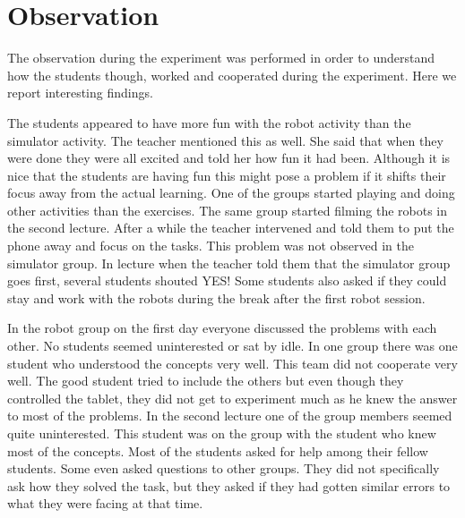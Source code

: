 \section{Observation}
The observation during the experiment was performed in order to understand how the students though, worked and cooperated during the experiment. Here we report interesting findings.

\bigskip\noindent
The students appeared to have more fun with the robot activity than the simulator activity. The teacher mentioned this as well. She said that when they were done they were all excited and told her how fun it had been. Although it is nice that the students are having fun this might pose a problem if it shifts their focus away from the actual learning. One of the groups started playing and doing other activities than the exercises. The same group started filming the robots in the second lecture. After a while the teacher intervened and told them to put the phone away and focus on the tasks. This problem was not observed in the simulator group. In lecture when the teacher told them that the simulator group goes first, several students shouted YES! Some students also asked if they could stay and work with the robots during the break after the first robot session. 

\bigskip\noindent
In the robot group on the first day everyone discussed the problems with each other. No students seemed uninterested or sat by idle. In one group there was one student who understood the concepts very well. This team did not cooperate very well. The good student tried to include the others but even though they controlled the tablet, they did not get to experiment much as he knew the answer to most of the problems. In the second lecture one of the group members seemed quite uninterested. This student was on the group with the student who knew most of the concepts. Most of the students asked for help among their fellow students. Some even asked questions to other groups. They did not specifically ask how they solved the task, but they asked if they had gotten similar errors to what they were facing at that time.

